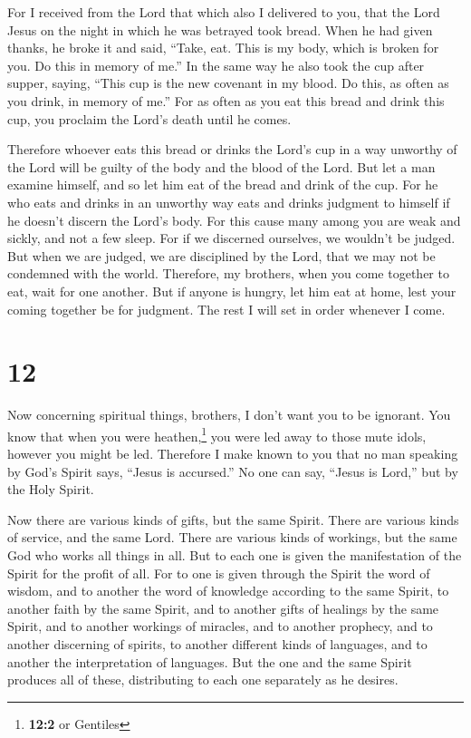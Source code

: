  For I received from the Lord that which also I delivered
to you, that the Lord Jesus on the night in which he was betrayed took
bread.  When he had given thanks, he broke it and said,
``Take, eat. This is my body, which is broken for you. Do this in memory
of me.''  In the same way he also took the cup after
supper, saying, ``This cup is the new covenant in my blood. Do this, as
often as you drink, in memory of me.''  For as often as
you eat this bread and drink this cup, you proclaim the Lord's death
until he comes.

 Therefore whoever eats this bread or drinks the Lord's
cup in a way unworthy of the Lord will be guilty of the body and the
blood of the Lord.  But let a man examine himself, and so
let him eat of the bread and drink of the cup.  For he
who eats and drinks in an unworthy way eats and drinks judgment to
himself if he doesn't discern the Lord's body.  For this
cause many among you are weak and sickly, and not a few sleep.
 For if we discerned ourselves, we wouldn't be judged.
 But when we are judged, we are disciplined by the Lord,
that we may not be condemned with the world.  Therefore,
my brothers, when you come together to eat, wait for one another.
 But if anyone is hungry, let him eat at home, lest your
coming together be for judgment. The rest I will set in order whenever I
come.

\hypertarget{section-11}{%
\section{12}\label{section-11}}

 Now concerning spiritual things, brothers, I don't want
you to be ignorant.  You know that when you were
heathen,\footnote{\textbf{12:2} or Gentiles} you were led away to those
mute idols, however you might be led.  Therefore I make
known to you that no man speaking by God's Spirit says, ``Jesus is
accursed.'' No one can say, ``Jesus is Lord,'' but by the Holy Spirit.

 Now there are various kinds of gifts, but the same
Spirit.  There are various kinds of service, and the same
Lord.  There are various kinds of workings, but the same
God who works all things in all.  But to each one is given
the manifestation of the Spirit for the profit of all. 
For to one is given through the Spirit the word of wisdom, and to
another the word of knowledge according to the same Spirit,
 to another faith by the same Spirit, and to another gifts
of healings by the same Spirit,  and to another workings
of miracles, and to another prophecy, and to another discerning of
spirits, to another different kinds of languages, and to another the
interpretation of languages.  But the one and the same
Spirit produces all of these, distributing to each one separately as he
desires.

